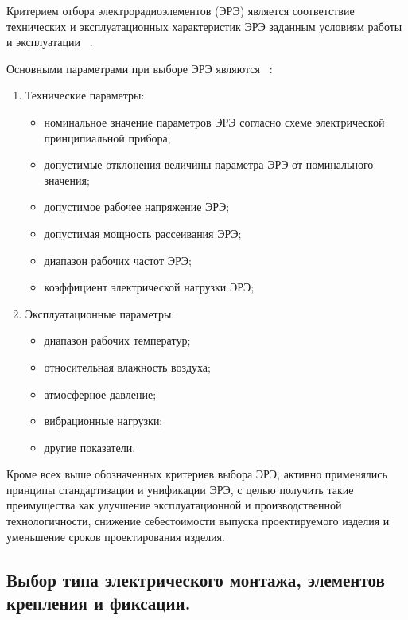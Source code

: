 Критерием отбора электрорадиоэлементов (ЭРЭ) является соответствие
технических и эксплуатационных характеристик ЭРЭ заданным условиям
работы и эксплуатации ~\cite{Alexeev2011}.

Основными параметрами при выборе ЭРЭ являются ~\cite{Alexeev2011}:
\begin{enumerate}
\item Технические параметры:
  
  \begin{itemize}
  \item номинальное значение параметров ЭРЭ согласно схеме
    электрической принципиальной прибора;
  \item допустимые отклонения величины параметра ЭРЭ от номинального
    значения;
    
  \item допустимое рабочее напряжение ЭРЭ;
    
  \item допустимая мощность рассеивания ЭРЭ; 
  \item диапазон рабочих частот ЭРЭ;
  \item коэффициент электрической нагрузки ЭРЭ;
  \end{itemize}

\item Эксплуатационные параметры:
  \begin{itemize}
  \item диапазон рабочих температур;
  \item относительная влажность воздуха;
  \item атмосферное давление;
  \item вибрационные нагрузки;    
  \item другие показатели.
  \end{itemize}  
\end{enumerate}

Кроме всех выше обозначенных критериев выбора ЭРЭ, активно
применялись принципы стандартизации и унификации ЭРЭ, с
целью получить такие преимущества как улучшение эксплуатационной и
производственной технологичности, снижение себестоимости выпуска
проектируемого изделия и уменьшение сроков проектирования изделия.


\subsection{Выбор типа электрического монтажа,
  элементов крепления и фиксации. }

